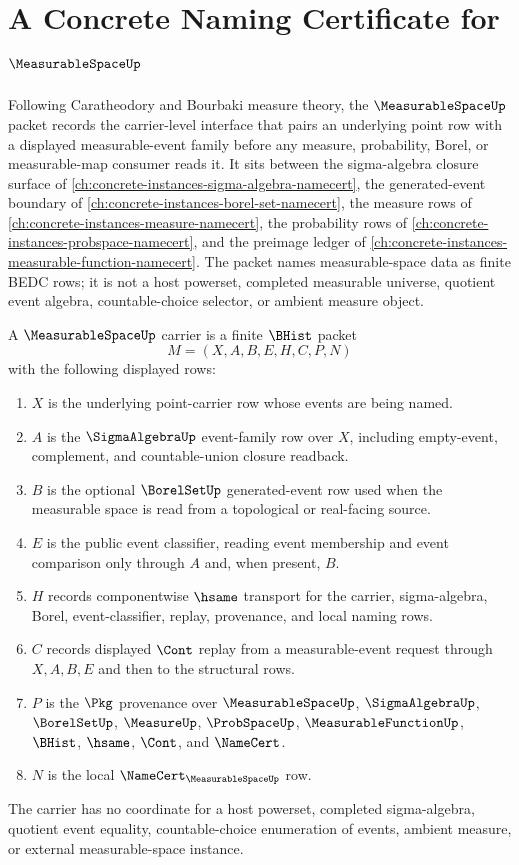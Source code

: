 \chapter{A Concrete Naming Certificate for $\MeasurableSpaceUp$}
\label{ch:concrete-instances-measurable-space-namecert}

Following Caratheodory and Bourbaki measure theory, the $\MeasurableSpaceUp$ packet records the carrier-level interface that pairs an underlying point row with a displayed measurable-event family before any measure, probability, Borel, or measurable-map consumer reads it. It sits between the sigma-algebra closure surface of \autoref{ch:concrete-instances-sigma-algebra-namecert}, the generated-event boundary of \autoref{ch:concrete-instances-borel-set-namecert}, the measure rows of \autoref{ch:concrete-instances-measure-namecert}, the probability rows of \autoref{ch:concrete-instances-probspace-namecert}, and the preimage ledger of \autoref{ch:concrete-instances-measurable-function-namecert}. The packet names measurable-space data as finite BEDC rows; it is not a host powerset, completed measurable universe, quotient event algebra, countable-choice selector, or ambient measure object.

\begin{definition}
\label{def:measurable-space-carrier}
A $\MeasurableSpaceUp$ carrier is a finite $\BHist$ packet
$$
M=(X,A,B,E,H,C,P,N)
$$
with the following displayed rows:
\begin{enumerate}
\item $X$ is the underlying point-carrier row whose events are being named.
\item $A$ is the $\SigmaAlgebraUp$ event-family row over $X$, including empty-event, complement, and countable-union closure readback.
\item $B$ is the optional $\BorelSetUp$ generated-event row used when the measurable space is read from a topological or real-facing source.
\item $E$ is the public event classifier, reading event membership and event comparison only through $A$ and, when present, $B$.
\item $H$ records componentwise $\hsame$ transport for the carrier, sigma-algebra, Borel, event-classifier, replay, provenance, and local naming rows.
\item $C$ records displayed $\Cont$ replay from a measurable-event request through $X,A,B,E$ and then to the structural rows.
\item $P$ is the $\Pkg$ provenance over $\MeasurableSpaceUp$, $\SigmaAlgebraUp$, $\BorelSetUp$, $\MeasureUp$, $\ProbSpaceUp$, $\MeasurableFunctionUp$, $\BHist$, $\hsame$, $\Cont$, and $\NameCert$.
\item $N$ is the local $\NameCert_{\MeasurableSpaceUp}$ row.
\end{enumerate}
The carrier has no coordinate for a host powerset, completed sigma-algebra, quotient event equality, countable-choice enumeration of events, ambient measure, or external measurable-space instance.
\end{definition}

